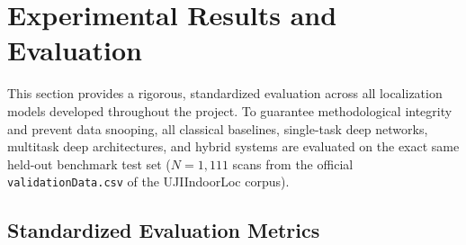 
\section{Experimental Results and Evaluation}
\label{sec:results_evaluation}

This section provides a rigorous, standardized evaluation across all localization models developed throughout the project. 
To guarantee methodological integrity and prevent data snooping, all classical baselines, single-task deep networks, multitask deep architectures, and hybrid systems are evaluated on the exact same held-out benchmark test set ($N = 1{,}111$ scans from the official \texttt{validationData.csv} of the UJIIndoorLoc corpus).

\subsection{Standardized Evaluation Metrics}

